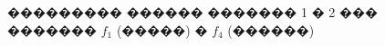 \documentclass[a4paper]{article}
\begin{document}
\begin{figure}[!h]
\begin{minipage}[h]{0.49\linewidth}
  \end{minipage}
  \caption{��������� ������ ������� 1 � 2 ��� ������� $f_1$ (�����) � $f_4$ (������)}
  \label{r1}
\end{figure}
\end{document}
